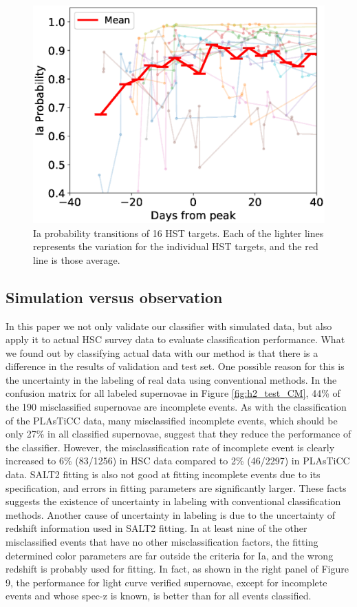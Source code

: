 \documentclass[useamsfonts]{pasj01}
\begin{document}
%
%
\begin{figure}[ht]
  \begin{center}
     \includegraphics[width=\columnwidth]{figures/HST_DaysFromPeak_vs_IaProbability_200108.eps}
  \end{center}
  \caption{%
  Ia probability transitions of 16 HST targets. Each of the lighter lines represents the variation for the individual HST targets, and the red line is those average.
  }%
  \label{fig:HSTIaprob}
\end{figure}
%
%
\subsection{Simulation versus observation}
%
In this paper we not only validate our classifier with simulated data, but also apply it to actual HSC survey data to evaluate classification performance.
What we found out by classifying actual data with our method is that there is a difference in the results of validation and test set.
One possible reason for this is the uncertainty in the labeling of real data using conventional methods.
In the confusion matrix for all labeled supernovae in Figure \ref{fig:h2_test_CM}, 44\% of the 190 misclassified supernovae are incomplete events.
As with the classification of the PLAsTiCC data, many misclassified incomplete events, which should be only 27\% in all classified supernovae, suggest that they reduce the performance of the classifier.
However, the misclassification rate of incomplete event is clearly increased to 6\% (83/1256) in HSC data compared to 2\% (46/2297) in PLAsTiCC data.
SALT2 fitting is also not good at fitting incomplete events due to its specification, and errors in fitting parameters are significantly larger.
These facts suggests the existence of uncertainty in labeling with conventional classification methods.
Another cause of uncertainty in labeling is due to the uncertainty of redshift information used in SALT2 fitting.
In at least nine of the other misclassified events that have no other misclassification factors, the fitting determined color parameters are far outside the criteria for Ia, and the wrong redshift is probably used for fitting.
In fact, as shown in the right panel of Figure 9, the performance for light curve verified supernovae, except for incomplete events and whose spec-z is known, is better than for all events classified.
\end{document}
